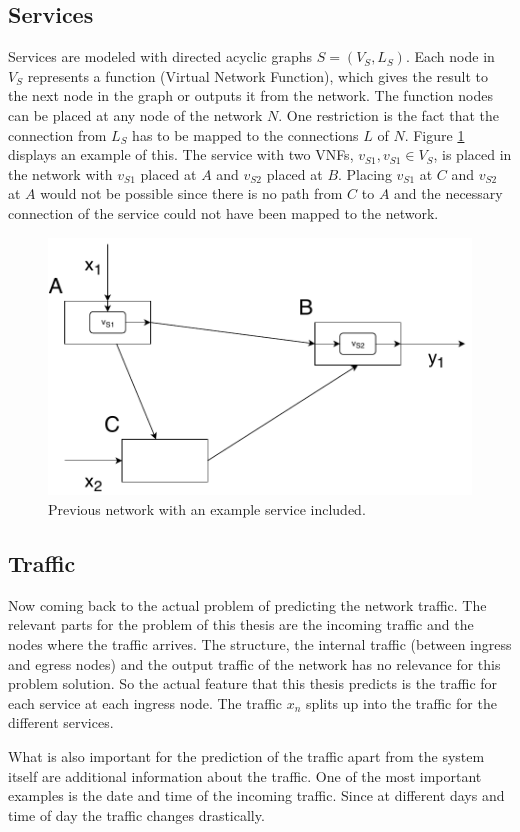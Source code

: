 \subsection{Services}
Services are modeled with directed acyclic graphs $S = ({V}_{S},{L}_{S})$.
Each node in ${V}_{S}$ represents a function (Virtual Network Function), which gives the result to the next node in the graph or outputs it from the network.
The function nodes can be placed at any node of the network $N$.
One restriction is the fact that the connection from ${L}_{S}$ has to be mapped to the connections $L$ of $N$.
Figure \ref{fig:networService} displays an example of this.
The service with two VNFs, $v_{S1},v_{S1} \in V_{S}$, is placed in the network with $v_{S1}$ placed at $A$ and $v_{S2}$ placed at $B$.
Placing $v_{S1}$ at $C$ and $v_{S2}$ at $A$ would not be possible since there is no path from $C$ to $A$ and the necessary connection of the service could not have been mapped to the network.

\begin{figure}
	\centering
	\includegraphics[width=0.6\linewidth]{Pictures/NetworkExampleWithService}
	\caption{Previous network with an example service included.}
	\label{fig:networService}
\end{figure}

\subsection{Traffic}
Now coming back to the actual problem of predicting the network traffic.
The relevant parts for the problem of this thesis are the incoming traffic and the nodes where the traffic arrives.
The structure, the internal traffic (between ingress and egress nodes) and the output traffic of the network has no relevance for this problem solution.
So the actual feature that this thesis predicts is the traffic for each service at each ingress node.
The traffic $x_{n}$ splits up into the traffic for the different services.

What is also important for the prediction of the traffic apart from the system itself are additional information about the traffic.
One of the most important examples is the date and time of the incoming traffic.
Since at different days and time of day the traffic changes drastically.